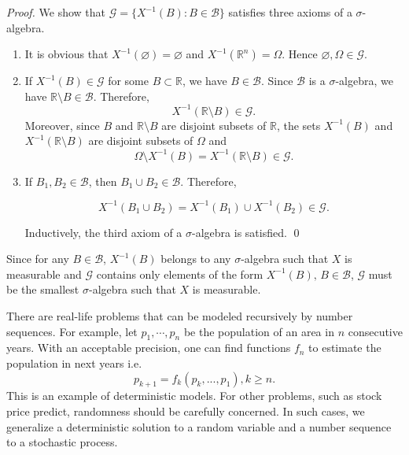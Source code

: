 \textit{Proof.} We show that $\mathcal{G}=\{X^{-1}(B) : B\in \mathcal{B}\}$ satisfies three axioms of a $\sigma$-algebra.

\begin{enumerate}
    \item It is obvious that $X^{-1}(\varnothing)=\varnothing$ and $X^{-1}(\mathbb{R}^n)=\Omega.$ Hence $\varnothing, \Omega\in\mathcal{G}$.
    \item If $X^{-1}(B)\in \mathcal{G}$ for some $B\subset\mathbb{R}$, we have $B\in\mathcal{B}$. Since $\mathcal{B}$ is a $\sigma$-algebra, we have $\mathbb{R}\setminus B\in\mathcal{B}$. Therefore,
          $$X^{-1}(\mathbb{R}\setminus B)\in\mathcal{G}.$$
          Moreover, since $B$ and $\mathbb{R}\setminus B$ are disjoint subsets of $\mathbb{R}$, the sets $X^{-1}(B)$ and $X^{-1}(\mathbb{R}\setminus B)$ are disjoint subsets of $\Omega$ and $$\Omega\setminus X^{-1}(B)=X^{-1}(\mathbb{R}\setminus B)\in\mathcal{G}.$$
    \item If $B_1,B_2\in\mathcal{B}$, then $B_1\cup B_2\in\mathcal{B}$. Therefore,

          $$X^{-1}(B_1\cup B_2) = X^{-1}(B_1)\cup X^{-1}(B_2)\in \mathcal{G}.$$

          Inductively, the third axiom of a $\sigma$-algebra is satisfied. \qed
\end{enumerate}

Since for any $B\in\mathcal{B}$, $X^{-1}(B)$ belongs to any $\sigma$-algebra such that $X$ is measurable and $\mathcal{G}$ contains only elements of the form $X^{-1}(B),\,B\in\mathcal{B}$, $\mathcal{G}$ must be the smallest $\sigma$-algebra such that $X$ is measurable.

There are real-life problems that can be modeled recursively by number sequences. For example, let $p_1,\cdots, p_n$ be the population of an area in $n$ consecutive years. With an acceptable precision, one can find functions $f_n$ to estimate the population in next years i.e.
$$p_{k+1}=f_k(p_{k},...,p_1), k \ge n.$$
This is an example of deterministic models. For other problems, such as stock price predict, randomness should be carefully concerned. In such cases, we generalize a deterministic solution to a random variable and a number sequence to a stochastic process.


